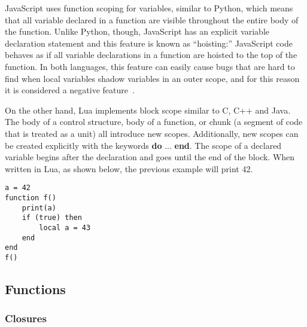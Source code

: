 JavaScript uses function scoping for variables, similar to Python, which means that all 
variable declared in a function are visible throughout the entire body of the function.
Unlike Python, though, JavaScript has an explicit variable declaration statement and
this feature is known as ``hoisting:'' JavaScript code behaves as if all 
variable declarations in a function are hoisted to the top of the function. In both
languages, this feature can easily cause bugs that are hard to find when local variables
shadow variables in an outer scope, and for this reason it is considered a negative 
feature~\cite{goodparts}.


On the other hand, Lua implements block scope similar to C, C++ and Java.
The body of a control structure, body of a function, or chunk (a segment of
code that is treated as a unit) all introduce new scopes. Additionally,
new scopes can be created explicitly with the keywords \textbf{do} ... \textbf{end}.
The scope of a declared variable begins after the declaration and goes until the
end of the block. When written in Lua, as shown below, the previous example
will print 42. 

\begin{lstlisting}[language={[5.2]Lua},caption=A demonstration of block scope in Lua.]
a = 42
function f()
	print(a)
    if (true) then
        local a = 43
    end
end
f()
\end{lstlisting}

\subsection{Functions}
\label{functions}



\subsubsection{Closures}
\label{closures}

